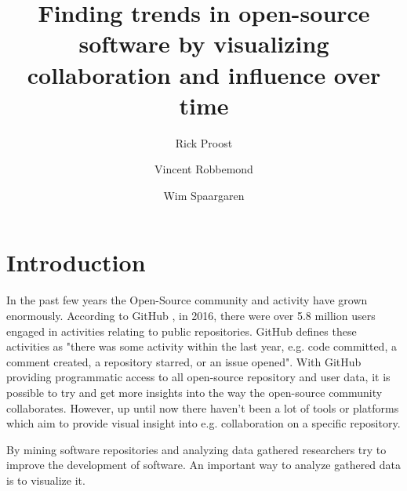\documentclass[acmtog, authorversion]{acmart}
\begin{document}
\title{Finding trends in open-source software by visualizing collaboration and influence over time} 

\author{Rick Proost}

\author{Vincent Robbemond}

\author{Wim Spaargaren}

\maketitle

\begin{abstract}
	
\end{abstract}

\section{Introduction}
In the past few years the Open-Source community and activity have grown enormously.
According to GitHub \cite{GHOctoverse}, in 2016, there were over 5.8 million users engaged in activities relating to public repositories. 
GitHub defines these activities as "there was some activity within the last year, e.g. code committed, a comment created, a repository starred, or an issue opened". 
With GitHub providing programmatic access to all open-source repository and user data, it is possible to try and get more insights into the way the open-source community collaborates. 
However, up until now there haven't been a lot of tools or platforms which aim to provide visual insight into e.g. collaboration on a specific repository.

By mining software repositories and analyzing data gathered researchers try to improve the development of software. 
An important way to analyze gathered data is to visualize it. 
\end{document}
